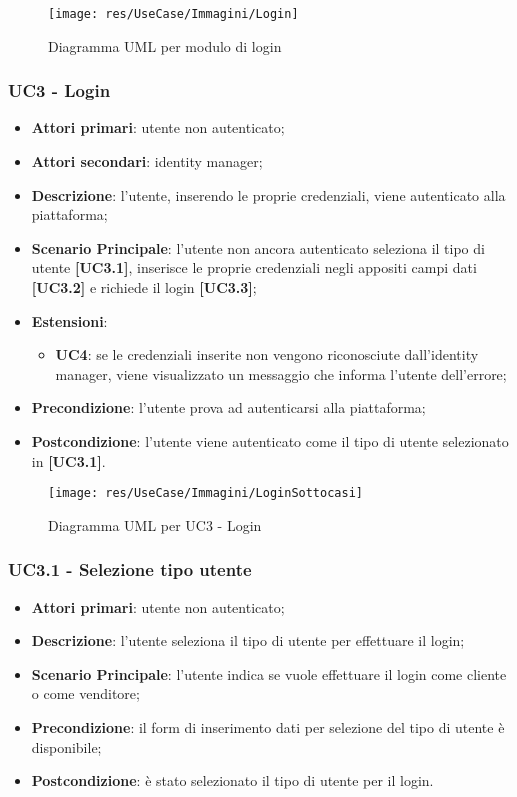 \begin{figure}[H]
\centering
\texttt{[image: res/UseCase/Immagini/Login]}
\caption{Diagramma UML per modulo di login}
\end{figure}

\subsubsection{UC3 - Login}
\begin{itemize}
\item \textbf{Attori primari}: utente non autenticato;
\item \textbf{Attori secondari}: identity manager;
\item \textbf{Descrizione}: l'utente, inserendo le proprie credenziali, viene autenticato alla piattaforma;
\item \textbf{Scenario Principale}: l'utente non ancora autenticato seleziona il tipo di utente \textbf{[UC3.1]}, inserisce le proprie credenziali negli appositi campi dati \textbf{[UC3.2]} e richiede il login \textbf{[UC3.3]};
\item \textbf{Estensioni}:
\begin{itemize}
	\item \textbf{UC4}: se le credenziali inserite non vengono riconosciute dall'identity manager, viene visualizzato un messaggio che informa l'utente dell'errore;
\end{itemize}
\item \textbf{Precondizione}: l'utente prova ad autenticarsi alla piattaforma;
\item \textbf{Postcondizione}: l'utente viene autenticato come il tipo di utente selezionato in \textbf{[UC3.1]}.
\end{itemize}

\begin{figure}[H]
\centering
\texttt{[image: res/UseCase/Immagini/LoginSottocasi]}
\caption{Diagramma UML per UC3 - Login}
\end{figure}

\subsubsection{UC3.1 - Selezione tipo utente}
\begin{itemize}
\item \textbf{Attori primari}: utente non autenticato;
\item \textbf{Descrizione}: l'utente seleziona il tipo di utente per effettuare il login;
\item \textbf{Scenario Principale}: l'utente indica se vuole effettuare il login come cliente o come venditore;
\item \textbf{Precondizione}: il form di inserimento dati per selezione del tipo di utente è disponibile;
\item \textbf{Postcondizione}: è stato selezionato il tipo di utente per il login.
\end{itemize}

